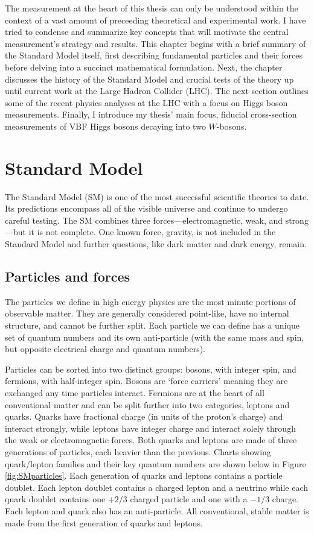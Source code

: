The measurement at the heart of this thesis can only be understood within the context of a vast amount of preceeding theoretical and experimental work. I have tried to condense and summarize key concepts that will motivate the central measurement's strategy and results. This chapter begins with a brief summary of the Standard Model itself, first describing fundamental particles and their forces before delving into a succinct mathematical formulation. Next, the chapter discusses the history of the Standard Model and crucial tests of the theory up until current work at the Large Hadron Collider (LHC). The next section outlines some of the recent physics analyses at the LHC with a focus on Higgs boson measurements. Finally, I introduce my thesis' main focus, fiducial cross-section measurements of VBF Higgs bosons decaying into two $W$-bosons.

\section{Standard Model}

The Standard Model (SM) is one of the most successful scientific theories to date. Its predictions encompass all of the visible universe and continue to undergo careful testing. The SM combines three forces---electromagnetic, weak, and strong---but it is not complete. One known force, gravity, is not included in the Standard Model and further questions, like dark matter and dark energy, remain. 

\subsection{Particles and forces}
The particles we define in high energy physics are the most minute portions of observable matter. They are generally considered point-like, have no internal structure, and cannot be further split. Each particle we can define has a unique set of quantum numbers and its own anti-particle (with the same mass and spin, but opposite electrical charge and quantum numbers).

Particles can be sorted into two distinct groups: bosons, with integer spin, and fermions, with half-integer spin. Bosons are `force carriers' meaning they are exchanged any time particles interact. Fermions are at the heart of all conventional matter and can be split further into two categories, leptons and quarks. Quarks have fractional charge (in units of the proton's charge) and interact strongly, while leptons have integer charge and interact solely through the weak or electromagnetic forces. Both quarks and leptons are made of three generations of particles, each heavier than the previous. Charts showing quark/lepton families and their key quantum numbers are shown below in Figure \ref{fig:SMparticles}. Each generation of quarks and leptons contains a particle doublet. Each lepton doublet contains a charged lepton and a neutrino while each quark doublet contains one $+2/3$ charged particle and one with a $-1/3$ charge. Each lepton and quark also has an anti-particle. All conventional, stable matter is made from the first generation of quarks and leptons.

